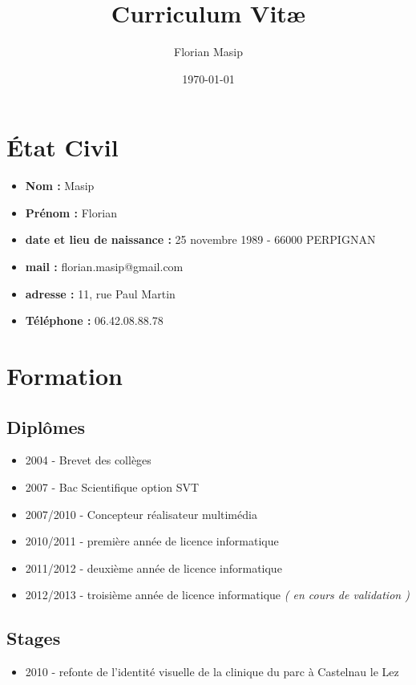 \documentclass[a4paper]{article}
\title{Curriculum Vit\ae}
\author{Florian Masip}
\date{\today}
\begin{document}
\maketitle

\section{\'Etat Civil}

\begin{itemize}
\item\textbf{ Nom :} Masip
\item\textbf{ Prénom :} Florian
\item\textbf{ date et lieu de naissance :} 25 novembre 1989 - 66000 PERPIGNAN
\item\textbf{ mail :} florian.masip@gmail.com
\item\textbf{ adresse :} 11, rue Paul Martin
\item\textbf{ Téléphone :} 06.42.08.88.78
\end{itemize}

\section{Formation}

\subsection{Diplômes}

\begin{itemize}
\item 2004 - Brevet des collèges
\item 2007 - Bac Scientifique option SVT
\item 2007/2010 - Concepteur réalisateur multimédia
\item 2010/2011 - première année de licence informatique
\item 2011/2012 - deuxième année de licence informatique
\item 2012/2013 - troisième année de licence informatique \textit{( en cours de validation )}
\end{itemize}

\subsection{Stages}

\begin{itemize}
\item 2010 - refonte de l'identité visuelle de la clinique du parc à Castelnau le Lez
\end{itemize}
\end{document}
